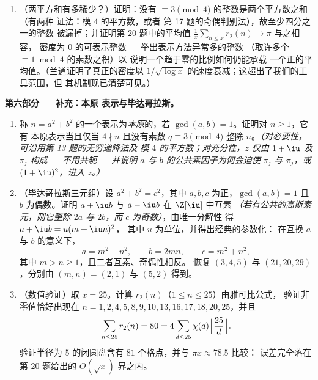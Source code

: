 \begin{problem}
\begin{enumerate}[resume]
        $\equiv 3$ 的因数的平均超出量：这是借算术计算出的分析。
  \item （两平方和有多稀少？）证明：没有
        $\equiv 3 \pmod 4$ 的整数是两个平方数之和（有两种
        证法：模 $4$ 的平方数，或者
        第 17 题的奇偶判别法），故至少四分之一的整数
        被漏掉；并证明第 20 题中的平均值 $\frac1x\sum_{n\leq
        x}r_2(n) \to \pi$ 与之相容，
        密度为 $0$ 的可表示整数 ---
        举出表示方法异常多的整数
        （取许多个 $\equiv 1 \bmod 4$ 的素数之积）以
        说明一个趋于零的比例如何仍能承载
        一个正的平均值。（兰道证明了真正的密度以
        $1/\sqrt{\log x}$ 的速度衰减；这超出了我们的工具范围，但
        其机制现已清楚可见。）
\end{enumerate}

\medskip
\noindent\textbf{第六部分 --- 补充：本原
表示与毕达哥拉斯。}
\begin{enumerate}[resume]
  \item 称 $n = a^2 + b^2$ 的一个表示为\emph{本原}的，若
        $\gcd(a, b) = 1$。证明对 $n \geq 1$，它有
        本原表示当且仅当 $4 \nmid n$ 且没有素数
        $q \equiv 3 \pmod 4$ 整除 $n$。\emph{（对必要性，
        可沿用第 13 题的无穷递降法及
        模 $4$ 的平方数；对充分性，$z$ 仅由 $1 + \iu$
        及 $\pi_j$ 构成 --- 不用共轭 --- 并说明
        $a$ 与 $b$ 的公共素因子为何会迫使
        $\pi_j$ 与 $\bar\pi_j$，或 $(1+\iu)^2$，进入
        $z$。）}
  \item （毕达哥拉斯三元组）设 $a^2 + b^2 = c^2$，其中 $a, b,
        c$ 为正，$\gcd(a, b) = 1$ 且 $b$ 为偶数。证明
        $a + \iu b$ 与 $a - \iu b$ 在 $\Z[\iu]$ 中互素
        \emph{（若有公共的高斯素元，则它整除
        $2a$ 与 $2b$，而 $c$ 为奇数）}，由唯一分解性
        得 $a + \iu b = u(m + \iu n)^2$，
        其中 $u$ 为单位，并得出经典的参数化：
        在互换 $a$ 与 $b$ 的意义下，
        \[
        a = m^2 - n^2, \qquad b = 2mn, \qquad c = m^2 + n^2,
        \]
        其中 $m > n \geq 1$，且二者互素、奇偶性相反。
        恢复 $(3, 4, 5)$ 与 $(21, 20, 29)$，分别由 $(m, n) =
        (2, 1)$ 与 $(5, 2)$ 得到。
  \item （数值验证）取 $x = 25$。计算
        $r_2(n)$（$1 \leq n \leq 25$）由雅可比公式，
        验证非零值恰好出现在 $n = 1,
        2, 4, 5, 8, 9, 10, 13, 16, 17, 18, 20, 25$，并且
        \[
        \sum_{n \leq 25} r_2(n) = 80
        = 4\sum_{d \leq 25}\chi(d)
        \Bigl\lfloor\frac{25}d\Bigr\rfloor .
        \]
        验证半径为 $5$ 的闭圆盘含有 $81$
        个格点，并与 $\pi x \approx 78.5$ 比较：
        误差完全落在第
        20 题给出的 $O(\sqrt x)$ 界之内。
\end{enumerate}
\end{problem}
